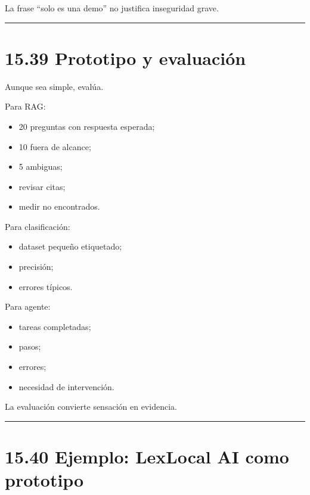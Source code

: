 La frase ``solo es una demo'' no justifica inseguridad grave.

\begin{center}\rule{0.5\linewidth}{0.5pt}\end{center}

\section{15.39 Prototipo y evaluación}\label{prototipo-y-evaluaciuxf3n}

Aunque sea simple, evalúa.

Para RAG:

\begin{itemize}
\tightlist
\item
  20 preguntas con respuesta esperada;
\item
  10 fuera de alcance;
\item
  5 ambiguas;
\item
  revisar citas;
\item
  medir no encontrados.
\end{itemize}

Para clasificación:

\begin{itemize}
\tightlist
\item
  dataset pequeño etiquetado;
\item
  precisión;
\item
  errores típicos.
\end{itemize}

Para agente:

\begin{itemize}
\tightlist
\item
  tareas completadas;
\item
  pasos;
\item
  errores;
\item
  necesidad de intervención.
\end{itemize}

La evaluación convierte sensación en evidencia.

\begin{center}\rule{0.5\linewidth}{0.5pt}\end{center}

\section{15.40 Ejemplo: LexLocal AI como
prototipo}\label{ejemplo-lexlocal-ai-como-prototipo}

